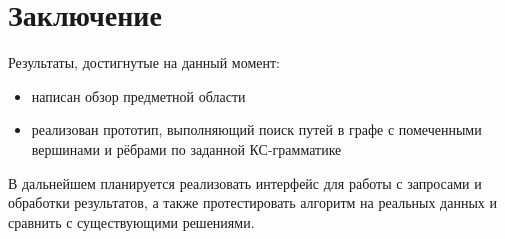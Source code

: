 \documentclass[14pt]{matmex-diploma}
\begin{document}
\section{Заключение}
Результаты, достигнутые на данный момент:
\begin{itemize}
    \item написан обзор предметной области
    \item реализован прототип, выполняющий поиск путей в графе с помеченными вершинами и рёбрами по заданной КС-грамматике
\end{itemize}
В дальнейшем планируется реализовать интерфейс для работы с запросами и обработки результатов, а также протестировать алгоритм на реальных данных и сравнить с существующими решениями.
\setmonofont[Mapping=tex-text]{CMU Typewriter Text}


\end{document}
